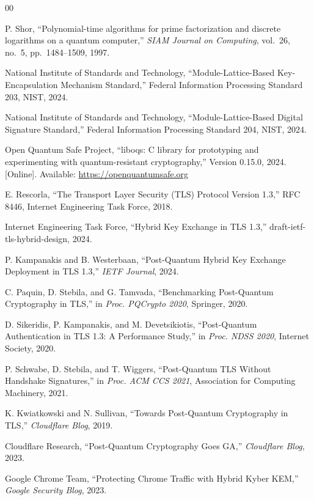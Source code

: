 \documentclass[conference]{IEEEtran}
\begin{document}
\begin{thebibliography}{00}

P. Shor, ``Polynomial-time algorithms for prime factorization and discrete logarithms
on a quantum computer,'' \textit{SIAM Journal on Computing}, vol.~26, no.~5,
pp.~1484--1509, 1997.

National Institute of Standards and Technology, ``Module-Lattice-Based
Key-Encapsulation Mechanism Standard,'' Federal Information Processing Standard 203,
NIST, 2024.

National Institute of Standards and Technology, ``Module-Lattice-Based Digital
Signature Standard,'' Federal Information Processing Standard 204, NIST, 2024.

Open Quantum Safe Project, ``liboqs: C library for prototyping and experimenting with
quantum-resistant cryptography,'' Version 0.15.0, 2024. [Online]. Available:
\url{https://openquantumsafe.org}

E. Rescorla, ``The Transport Layer Security (TLS) Protocol Version 1.3,'' RFC 8446,
Internet Engineering Task Force, 2018.

Internet Engineering Task Force, ``Hybrid Key Exchange in TLS 1.3,''
draft-ietf-tls-hybrid-design, 2024.

P. Kampanakis and B. Westerbaan, ``Post-Quantum Hybrid Key Exchange Deployment in
TLS 1.3,'' \textit{IETF Journal}, 2024.

C. Paquin, D. Stebila, and G. Tamvada, ``Benchmarking Post-Quantum Cryptography in
TLS,'' in \textit{Proc. PQCrypto 2020}, Springer, 2020.

D. Sikeridis, P. Kampanakis, and M. Devetsikiotis, ``Post-Quantum Authentication in
TLS 1.3: A Performance Study,'' in \textit{Proc. NDSS 2020}, Internet Society, 2020.

P. Schwabe, D. Stebila, and T. Wiggers, ``Post-Quantum TLS Without Handshake
Signatures,'' in \textit{Proc. ACM CCS 2021}, Association for Computing Machinery,
2021.

K. Kwiatkowski and N. Sullivan, ``Towards Post-Quantum Cryptography in TLS,''
\textit{Cloudflare Blog}, 2019.

Cloudflare Research, ``Post-Quantum Cryptography Goes GA,'' \textit{Cloudflare
Blog}, 2023.

Google Chrome Team, ``Protecting Chrome Traffic with Hybrid Kyber KEM,''
\textit{Google Security Blog}, 2023.


\end{thebibliography}
\end{document}
